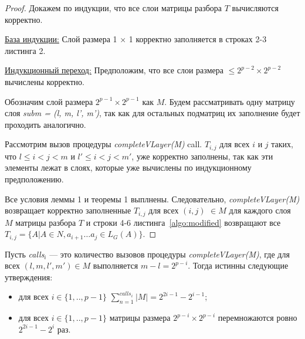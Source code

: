 \begin{proof}

Докажем по индукции, что все слои матрицы разбора $T$ вычисляются корректно.

\underline{База индукции:} Слой размера 1 × 1 корректно заполняется в строках 2-3 листинга 2.

\underline{Индукционный переход:} Предположим, что все слои размера $\le 2^{p - 2} \times 2^{p - 2}$ вычислены корректно.

Обозначим слой размера $2^{p - 1} \times 2^{p - 1}$ как $M$. Будем рассматривать одну матрицу слоя \textit{subm = (l, m, l', m')}, так как для остальных подматриц их заполнение будет проходить аналогично.

Рассмотрим вызов процедуры \textit{completeVLayer(M)} call.
$T_{i,j}$ для всех $i$ и $j$ таких, что $l \leq i < j < m$ и $l' \leq i < j < m'$, уже корректно заполнены, так как эти элементы лежат в слоях, которые уже вычислены по индукционному предположению.

Все условия леммы 1 и теоремы 1 выплнены. Следовательно, \textit{completeVLayer(M)} возвращает корректно заполненные $T_{i, j}$ для всех $(i, j)$ $\in M$ для каждого слоя $M$ матрицы разбора $T$ и строки 4-6 листинга~\ref{algo:modified} возвращают все $T_{i, j} =  \{ A | A \in N, a_{i + 1} \dots a_{j} \in L_{G}(A)\}$.

\end{proof}

\begin{lemma}
Пусть \textit{calls$_{i}$} --- это количество вызовов процедуры \textit{completeVLayer(M)}, где для всех $(l, m, l', m') \in M$ выполняется $m - l = 2^{p - i}$. Тогда истинны следующие утверждения:
\begin{itemize}
 \item для всех $i \in \{ 1, .., p - 1\}$  $\sum_{n=1}^{calls_i}{|M|} = 2^{2i - 1} - 2^{i - 1}$;
 \item для всех $ i \in \{ 1, .., p - 1\}$ матрицы размера $2^{p - i} \times 2^{p - i}$ перемножаются ровно $2^{2i - 1} - 2^{i}$ раз.
\end{itemize}
\end{lemma}

